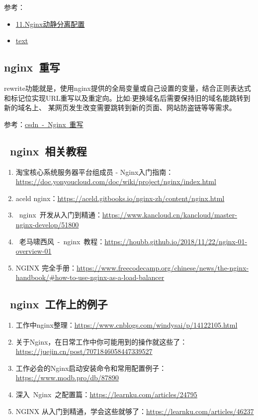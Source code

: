 \documentclass[12pt, a4paper]{article} %
\begin{document}
\begin{CJK*}{UTF8}{gbsn}
参考：

\begin{itemize}
    \item \href{https://www.jianshu.com/p/6c1a230f9e26}{11.Nginx动静分离配置}
    \item \href{}{text}
\end{itemize}

\subsection{nginx~重写}
rewrite功能就是，使用nginx提供的全局变量或自己设置的变量，结合正则表达式和标记位实现URL重写以及重定向。比如:更换域名后需要保持旧的域名能跳转到新的域名上、
某网页发生改变需要跳转到新的页面、网站防盗链等等需求。

参考：\href{https://blog.csdn.net/Moshizhu/article/details/125136067}{csdn~-~Nginx~重写}

\subsection{~nginx~相关教程}
\begin{enumerate}
    \item 淘宝核心系统服务器平台组成员 - Nginx入门指南：\url{https://doc.yonyoucloud.com/doc/wiki/project/nginx/index.html}
    \item aceld nginx：\url{https://aceld.gitbooks.io/nginx-zh/content/nginx.html}
    \item ~nginx~开发从入门到精通：\url{https://www.kancloud.cn/kancloud/master-nginx-develop/51800}
    \item ~老马啸西风~-~nginx~教程：\url{https://houbb.github.io/2018/11/22/nginx-01-overview-01}
    \item NGINX 完全手册：\url{https://www.freecodecamp.org/chinese/news/the-nginx-handbook/#how-to-use-nginx-as-a-load-balancer}
\end{enumerate}

\subsection{~nginx~工作上的例子}
\begin{enumerate}
    \item 工作中nginx整理：\url{https://www.cnblogs.com/windysai/p/14122105.html}
    \item 关于Nginx，在日常工作中你可能用到的操作就这些了：\url{https://juejin.cn/post/7071846058447339527}
    \item 工作必会的Nginx启动安装命令和常用配置例子：\url{https://www.modb.pro/db/87890}
    \item 深入~Nginx~之配置篇：\url{https://learnku.com/articles/24795}
    \item NGINX 从入门到精通，学会这些就够了：\url{https://learnku.com/articles/46237}
\end{enumerate}


\end{CJK*}
\end{document}
